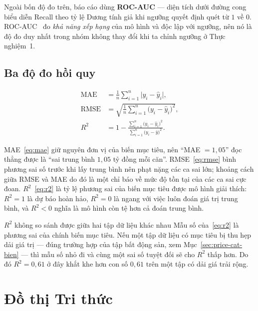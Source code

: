 Ngoài bốn độ đo trên, báo cáo dùng \textbf{ROC-AUC} --- diện tích dưới đường
cong biểu diễn Recall theo tỷ lệ Dương tính giả khi ngưỡng quyết định quét từ
$1$ về $0$. ROC-AUC~\cite{fawcett2006} đo \emph{khả năng xếp hạng} của mô hình và độc lập
với ngưỡng, nên nó là độ đo duy nhất trong nhóm không thay đổi khi ta chỉnh ngưỡng
ở Thực nghiệm~1.

\subsection{Ba độ đo hồi quy}

\begin{align}
\text{MAE}  &= \frac{1}{n}\sum_{i=1}^{n}\big| y_i - \hat y_i \big|, \label{eq:mae}\\[4pt]
\text{RMSE} &= \sqrt{\frac{1}{n}\sum_{i=1}^{n}\big( y_i - \hat y_i \big)^{2}}, \label{eq:rmse}\\[4pt]
R^{2} &= 1 - \frac{\sum_{i=1}^{n}\big( y_i - \hat y_i \big)^{2}}
                  {\sum_{i=1}^{n}\big( y_i - \bar y \big)^{2}}. \label{eq:r2}
\end{align}

\noindent MAE~\eqref{eq:mae} giữ nguyên đơn vị của biến mục tiêu, nên
``MAE $=1{,}05$'' đọc thẳng được là ``sai trung bình $1{,}05$ tỷ đồng mỗi căn''.
RMSE~\eqref{eq:rmse} bình phương sai số trước khi lấy trung bình nên phạt nặng
các ca sai lớn; khoảng cách giữa RMSE và MAE do đó là một chỉ báo về mức độ tồn
tại của các ca sai cực đoan. $R^{2}$~\eqref{eq:r2} là tỷ lệ phương sai của biến
mục tiêu được mô hình giải thích: $R^{2}=1$ là dự báo hoàn hảo, $R^{2}=0$ là
ngang với việc luôn đoán giá trị trung bình, và $R^{2}<0$ nghĩa là mô hình còn
tệ hơn cả đoán trung bình.

\begin{phathien}{$R^2$ không so sánh được giữa hai tập dữ liệu khác nhau}
Mẫu số của~\eqref{eq:r2} là phương sai của chính biến mục tiêu. Nếu một tập dữ
liệu có mục tiêu bị thu hẹp dải giá trị --- đúng trường hợp của tập bất động
sản, xem Mục~\ref{sec:price-cat-bien} --- thì mẫu số nhỏ đi và cùng một sai số
tuyệt đối sẽ cho $R^{2}$ thấp hơn. Do đó $R^{2}=0{,}61$ ở đây khắt khe hơn con
số $0{,}61$ trên một tập có dải giá trải rộng.
\end{phathien}

\section{Đồ thị Tri thức}
\label{sec:kg-lythuyet}

